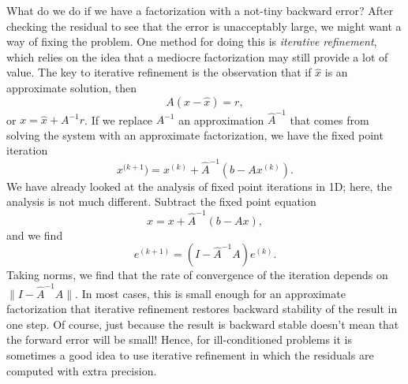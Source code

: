 \documentclass[12pt, leqno]{article}
\begin{document}
What do we do if we have a factorization with a not-tiny backward
error?  After checking the residual to see that the error is
unacceptably large, we might want a way of fixing the problem.
One method for doing this is {\em iterative refinement}, which relies
on the idea that a mediocre factorization may still provide a lot of
value.  The key to iterative refinement is the observation that if
$\hat{x}$ is an approximate solution, then
\[
  A (x-\hat{x}) = r,
\]
or $x = \hat{x} + A^{-1} r$.  If we replace $A^{-1}$ an approximation
$\hat{A}^{-1}$ that comes from solving the system with an approximate
factorization, we have the fixed point iteration
\[
  x^{(k+1}) = x^{(k)} + \hat A^{-1} (b-Ax^{(k)}).
\]
We have already looked at the analysis of fixed point iterations
in 1D; here, the analysis is not much different.  Subtract the
fixed point equation
\[
  x = x + \hat{A}^{-1} (b-Ax),
\]
and we find
\[
  e^{(k+1)} = (I-\hat A^{-1} A) e^{(k)}.
\]
Taking norms, we find that the rate of convergence of the iteration
depends on $\|I-\hat A^{-1} A\|$.  In most cases, this is small enough
for an approximate factorization that iterative refinement restores
backward stability of the result in one step.
%
Of course, just because the result is backward stable doesn't mean
that the forward error will be small!  Hence, for ill-conditioned
problems it is sometimes a good idea to use iterative refinement in
which the residuals are computed with extra precision.
\end{document}

